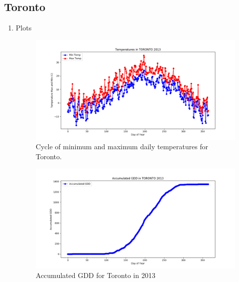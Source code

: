 \documentclass{article}
\begin{document}
\subsection{ \bf Toronto }

\begin{enumerate}

\item  Plots 

\begin{center}
\begin{figure}[H]
\includegraphics[width=5.25in]{Plot/Toronto/day_vs_temp_2013.png}



\caption{Cycle of minimum and maximum daily temperatures for Toronto.}
\label{3}
\end{figure}
\end{center}

\begin{figure}[H]
\includegraphics[width=5.25in]{Plot/toronto.png}



\caption{Accumulated GDD for Toronto in 2013}
\label{3.3}
\end{figure}

\end{enumerate}
\end{document}
